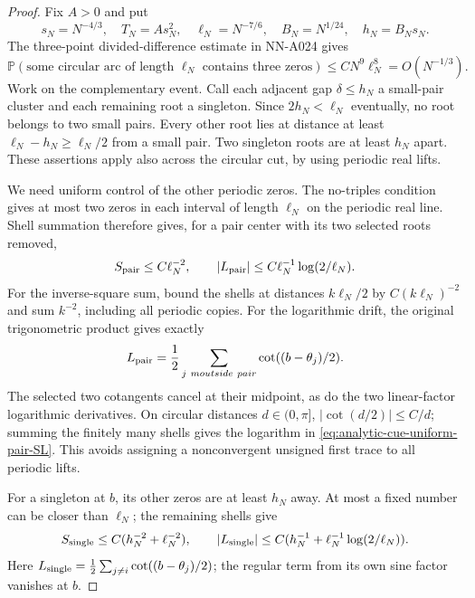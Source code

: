 \begin{proof}
Fix $A>0$ and put
\[
 s_N=N^{-4/3},\quad T_N=A s_N^2,\quad
 \ell_N=N^{-7/6},\quad B_N=N^{1/24},\quad h_N=B_Ns_N.
\]
The three-point divided-difference estimate in NN-A024 gives
\[
 \mathbb P(\text{some circular arc of length }\ell_N
                        \text{ contains three zeros})
       \le C N^9\ell_N^8=O(N^{-1/3}).
\]
Work on the complementary event. Call each adjacent gap
$\delta\le h_N$ a small-pair cluster and each remaining root
a singleton. Since $2h_N<\ell_N$ eventually, no root belongs
to two small pairs. Every other root lies at distance at least
$\ell_N-h_N\ge\ell_N/2$ from a small pair. Two singleton
roots are at least $h_N$ apart. These assertions apply also
across the circular cut, by using periodic real lifts.

We need uniform control of the other periodic zeros. The
no-triples condition gives at most two zeros in each interval
of length $\ell_N$ on the periodic real line. Shell summation
therefore gives, for a pair center with its two selected roots
removed,
\begin{equation}\label{eq:analytic-cue-uniform-pair-SL}
 S_{\rm pair}\le C\ell_N^{-2},\qquad
 |L_{\rm pair}|\le
                  C\ell_N^{-1}\log(2/\ell_N).
\end{equation}
For the inverse-square sum, bound the shells at distances
$k\ell_N/2$ by $C(k\ell_N)^{-2}$ and sum $k^{-2}$,
including all periodic copies. For the logarithmic drift,
the original trigonometric product gives exactly
\[
 L_{\rm pair}=\frac12\sum_{j\ {
m outside\ pair}}
                         \cot((b-\theta_j)/2).
\]
The selected two cotangents cancel at their midpoint, as do
the two linear-factor logarithmic derivatives. On circular
distances $d\in(0,\pi]$, $|\cot(d/2)|\le C/d$; summing the
finitely many shells gives the logarithm in
\eqref{eq:analytic-cue-uniform-pair-SL}. This avoids assigning
a nonconvergent unsigned first trace to all periodic lifts.

For a singleton at $b$, its other zeros are at least $h_N$
away. At most a fixed number can be closer than $\ell_N$;
the remaining shells give
\begin{equation}\label{eq:analytic-cue-uniform-single-SL}
 S_{\rm single}\le C(h_N^{-2}+\ell_N^{-2}),\qquad
 |L_{\rm single}|\le
               C(h_N^{-1}+\ell_N^{-1}\log(2/\ell_N)).
\end{equation}
Here $L_{\rm single}=\frac12\sum_{j\ne i}
\cot((b-\theta_j)/2)$; the regular term from its own sine
factor vanishes at $b$.


\end{proof}
